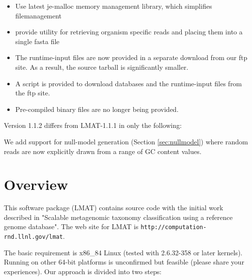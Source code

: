 \documentclass[11pt]{article}
\begin{document}
\begin{itemize}
\item Use latest je-malloc memory management library, which simplifies filemanagement
\item provide utility for retrieving organism specific reads and placing them into a single fasta file
\item The runtime-input files are now provided in a separate download from our ftp site.  As a result, the source tarball is significantly smaller.
\item A script is provided to download databases and the runtime-input files from the ftp site.
\item Pre-compiled binary files are no longer being provided.
\end{itemize}



Version 1.1.2 differs from LMAT-1.1.1 in only the following:

We add support for null-model generation (Section \ref{sec:nullmodel})
where random reads are now explicitly drawn from a range of GC content
values.


\section{Overview}

This software package (LMAT) contains source code with the initial work described in
"Scalable metagenomic taxonomy classification using a reference genome 
database".   
     The web site for LMAT is \texttt{http://computation-rnd.llnl.gov/lmat}.  
     
The basic requirement is x86_84 Linux (tested with 2.6.32-358 or later kernels).  Running on other 64-bit platforms is unconfirmed but feasible (please share your experiences).
Our approach is divided into two steps:
\end{document}
